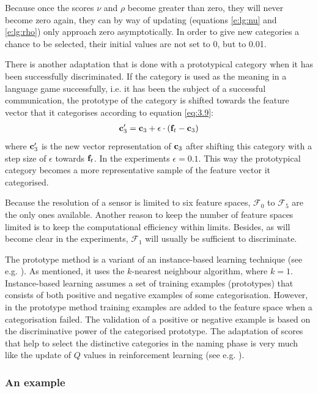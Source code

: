 Because once the scores $\nu$ and $\rho$ become greater than zero, they will never become zero again, they can by way of updating (equations \ref{e:lg:nu} and \ref{e:lg:rho}) only approach zero asymptotically. In order to give new categories a chance to be selected, their initial values are not set to 0, but to 0.01.

There is another adaptation that is done with a prototypical category when it has been successfully discriminated. If the category is used as the meaning in a language game successfully, i.e. it has been the subject of a successful communication, the prototype of the category is shifted towards the feature vector that it categorises according to equation \ref{eq:3.9}:
\begin{eqnarray} \label{eq:3.9}
{\bf c}_3' = {\bf c}_3 + \epsilon \cdot ({\bf f}_t - {\bf c}_3)
\end{eqnarray}
where ${\bf c}_3'$ is the new vector representation of  ${\bf c}_3$ after shifting this category with a step size of $\epsilon$ towards ${\bf f}_t$. In the experiments $\epsilon=0.1$. This way the prototypical category becomes a more representative sample of the feature vector it categorised.

Because the resolution of a sensor is limited to six feature spaces, ${\mathcal F}_0$ to ${\mathcal F}_5$ are the only ones available. Another reason to keep the number of feature spaces limited is to keep the computational efficiency within limits. Besides, as will become clear in the experiments, ${\mathcal F}_1$ will usually be sufficient to discriminate.

The prototype method is a variant of an instance-based learning technique (see e.g. \citealt{ahaetal:1991,mitchell:1997}). As mentioned, it uses the $k$-nearest neighbour algorithm, where $k=1$. Instance-based learning assumes a set of training examples (prototypes) that consists of both positive and negative examples of some categorisation. However, in the prototype method training examples are added to the feature space when a categorisation failed. The validation of a positive or negative example is based on the discriminative power of the categorised prototype. The adaptation of scores that help to select the distinctive categories in the naming phase is very much like the update of $Q$ values in reinforcement learning (see e.g. \citealt{suttonbarto:1998}). 

\subsubsection{An example}

